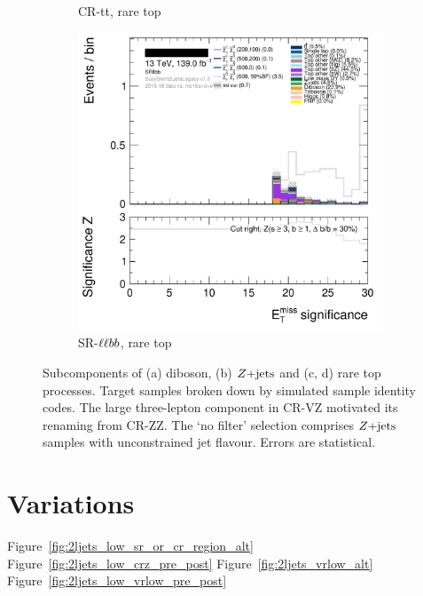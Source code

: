 \begin{figure}[tp]
\begin{subfigure}{0.48\textwidth}
\caption{CR-tt, rare top}
\end{subfigure}
\hfill
\begin{subfigure}{0.48\textwidth}
\centering
\includegraphics[width=\textwidth]{figures/2ljets_splits_met_Sign_SRllbb.png}
\caption{SR-$\ell\ell bb$, rare top}
\end{subfigure}
\caption[
Subcomponents of diboson, $\zjets$ and rare top processes.
]{%
Subcomponents of (a) diboson, (b) $\zjets$ and (c, d) rare top processes.
Target samples broken down by simulated sample identity codes.
The large three-lepton component in CR-VZ motivated its renaming from CR-ZZ.
The `no filter' selection comprises $\zjets$ samples with unconstrained jet
flavour.
Errors are statistical.
}
\label{fig:2ljets_splits}
\end{figure}


\section{Variations}
Figure~\ref{fig:2ljets_low_sr_or_cr_region_alt}
Figure~\ref{fig:2ljets_low_crz_pre_post}
Figure~\ref{fig:2ljets_vrlow_alt}
Figure~\ref{fig:2ljets_low_vrlow_pre_post}

